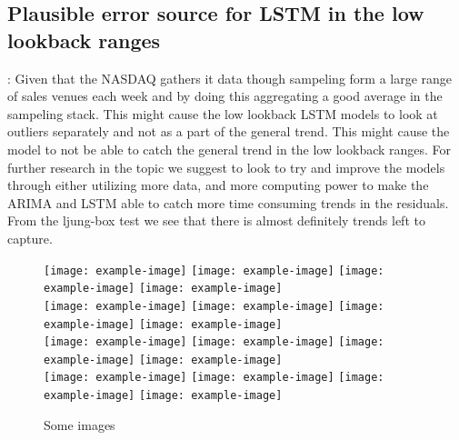 \subsection{Plausible error source for LSTM in the low lookback ranges}:
Given that the NASDAQ gathers it data though sampeling form a large range of sales venues each week and by doing this aggregating a good average in the sampeling stack. This might cause the low lookback LSTM models to look at outliers separately and not as a part of the general trend. This might cause the model to not be able to catch the general trend in the low lookback ranges.
For further research in the topic we suggest to look to try and improve the models through either utilizing more data, and more computing power to make the ARIMA and LSTM able to catch more time consuming trends in the residuals. From the ljung-box test we see that there is almost definitely trends left to capture.

\begin{figure}
    \texttt{[image: example-image]}\hfill
    \texttt{[image: example-image]}\hfill
    \texttt{[image: example-image]}\hfill
    \texttt{[image: example-image]}
    \\[\smallskipamount]
    \texttt{[image: example-image]}\hfill
    \texttt{[image: example-image]}\hfill
    \texttt{[image: example-image]}\hfill
    \texttt{[image: example-image]}
    \\[\smallskipamount]
    \texttt{[image: example-image]}\hfill
    \texttt{[image: example-image]}\hfill
    \texttt{[image: example-image]}\hfill
    \texttt{[image: example-image]}
    \\[\smallskipamount]
    \texttt{[image: example-image]}\hfill
    \texttt{[image: example-image]}\hfill
    \texttt{[image: example-image]}\hfill
    \texttt{[image: example-image]}
    \caption{Some images}\label{fig:foobar}
\end{figure}